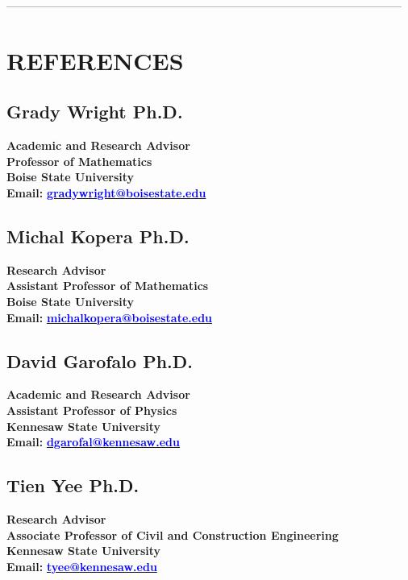 \documentclass[margin, 10pt]{res} %
\begin{document}
\begin{resume}
---------------------------------------------------------------------------------------------------------

\section{REFERENCES}

\subsection{Grady Wright Ph.D.}
\textbf{Academic and Research Advisor} \\
\textbf{Professor of Mathematics} \\
\textbf{Boise State University} \\
\textbf{Email:} \href{mailto:gradywright@boisestate.edu}{\textcolor{blue}{\textbf{gradywright@boisestate.edu}}}

\subsection{Michal Kopera Ph.D.}
\textbf{Research Advisor} \\
\textbf{Assistant Professor of Mathematics} \\
\textbf{Boise State University} \\
\textbf{Email:} \href{mailto:michalkopera@boisestate.edu}{\textcolor{blue}{\textbf{michalkopera@boisestate.edu}}}

\subsection{David Garofalo Ph.D.}
\textbf{Academic and Research Advisor} \\
\textbf{Assistant Professor of Physics} \\
\textbf{Kennesaw State University} \\
\textbf{Email:} \href{mailto:dgarofal@kennesaw.edu}{\textcolor{blue}{\textbf{dgarofal@kennesaw.edu}}}

\subsection{Tien Yee Ph.D.}
\textbf{Research Advisor} \\
\textbf{Associate Professor of Civil and Construction Engineering} \\ 
\textbf{Kennesaw State University} \\
\textbf{Email:} \href{mailto:tyee@kennesaw.edu}{\textcolor{blue}{\textbf{tyee@kennesaw.edu}}}


\end{resume}
\end{document}
